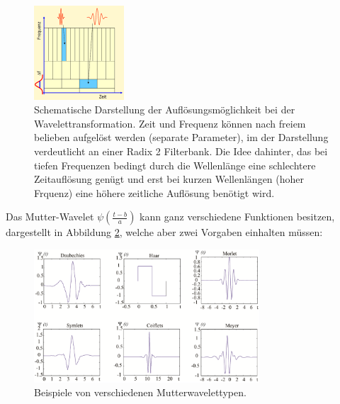\begin{figure}
	\centering
	\includegraphics[width=0.3\textwidth]{papers/wavelets/images/6-3_CWTAufloesungRadix2.png}
	\caption{Schematische Darstellung der Auflösungsmöglichkeit bei der Wavelettransformation. Zeit und Frequenz können nach freiem belieben aufgelöst werden (separate Parameter), im der Darstellung verdeutlicht an einer Radix 2 Filterbank. Die Idee dahinter, das bei tiefen Frequenzen bedingt durch die Wellenlänge eine schlechtere Zeitauflösung genügt und erst bei kurzen Wellenlängen (hoher Frquenz) eine höhere zeitliche Auflösung benötigt wird.}
	\label{wavelet:fig:CWTAufloesungRadix2}
\end{figure}

Das Mutter-Wavelet $\psi\left(\frac{t-b}{a}\right)$ kann ganz verschiedene Funktionen besitzen, dargestellt in Abbildung \ref{wavelet:fig:MutterwavletTypen}, welche aber zwei Vorgaben einhalten müssen:

\begin{figure}
	\centering
	\includegraphics[width=0.75\textwidth]{papers/wavelets/images/6-4_MutterwavletTypen.png}
	\caption{Beispiele von verschiedenen Mutterwavelettypen.}
	\label{wavelet:fig:MutterwavletTypen}
\end{figure}

